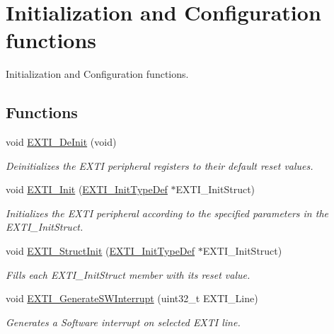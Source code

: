 \hypertarget{group___e_x_t_i___group1}{\section{Initialization and Configuration functions}
\label{group___e_x_t_i___group1}
}


Initialization and Configuration functions.  


\subsection*{Functions}
\begin{DoxyCompactItemize}
\item 
void \hyperlink{group___e_x_t_i___group1_ga07072e339cb9ecb9cd9d4b94afc9f317}{E\-X\-T\-I\-\_\-\-De\-Init} (void)
\begin{DoxyCompactList}\small\item\em Deinitializes the E\-X\-T\-I peripheral registers to their default reset values. \end{DoxyCompactList}\item 
void \hyperlink{group___e_x_t_i___group1_ga8c9ce6352a3a2dfc8fc9287cb24c6501}{E\-X\-T\-I\-\_\-\-Init} (\hyperlink{struct_e_x_t_i___init_type_def}{E\-X\-T\-I\-\_\-\-Init\-Type\-Def} $\ast$E\-X\-T\-I\-\_\-\-Init\-Struct)
\begin{DoxyCompactList}\small\item\em Initializes the E\-X\-T\-I peripheral according to the specified parameters in the E\-X\-T\-I\-\_\-\-Init\-Struct. \end{DoxyCompactList}\item 
void \hyperlink{group___e_x_t_i___group1_ga86b9e662d18a2f829999cfb26aa7ca20}{E\-X\-T\-I\-\_\-\-Struct\-Init} (\hyperlink{struct_e_x_t_i___init_type_def}{E\-X\-T\-I\-\_\-\-Init\-Type\-Def} $\ast$E\-X\-T\-I\-\_\-\-Init\-Struct)
\begin{DoxyCompactList}\small\item\em Fills each E\-X\-T\-I\-\_\-\-Init\-Struct member with its reset value. \end{DoxyCompactList}\item 
void \hyperlink{group___e_x_t_i___group1_ga897e8ea59f40a19e047fb9994876fc9b}{E\-X\-T\-I\-\_\-\-Generate\-S\-W\-Interrupt} (uint32\-\_\-t E\-X\-T\-I\-\_\-\-Line)
\begin{DoxyCompactList}\small\item\em Generates a Software interrupt on selected E\-X\-T\-I line. \end{DoxyCompactList}\end{DoxyCompactItemize}



